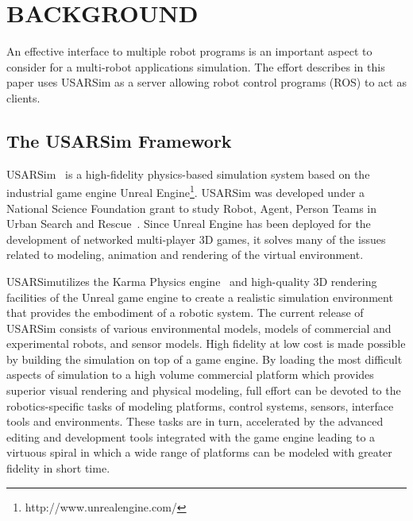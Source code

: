 \section*{BACKGROUND}
An effective interface to multiple robot programs is an important aspect to consider for a multi-robot applications simulation. The effort describes in this paper uses USARSim as a server allowing robot control programs (ROS)
to act as clients.

\subsection*{The USARSim Framework}


USARSim~\cite{CARPIN.LNAI.2006,WANG.WSC.2003} is a high-fidelity physics-based simulation system based on the industrial game engine Unreal Engine\footnote{http://www.unrealengine.com/}. USARSim was developed under a National Science Foundation grant to study Robot, Agent, Person Teams in Urban Search and Rescue~\cite{LEWIS.ICHC.2003}. Since Unreal Engine has been deployed for the development of networked multi-player 3D games, it solves many of the issues related to modeling, animation and rendering
of the virtual environment.


USARSimutilizes the Karma Physics engine~\cite{KarmEngine} and high-quality 3D rendering facilities of the Unreal game engine to create a realistic simulation environment that provides the embodiment of a robotic
system. The current release of USARSim consists of various environmental models, models of commercial and experimental robots, and sensor models. High fidelity at low cost is made possible by building the simulation on top of a game engine. By loading the most
difficult aspects of simulation to a high volume commercial platform which provides superior visual rendering and physical modeling, full effort can be devoted to the robotics-specific tasks of modeling platforms, control systems, sensors, interface tools and environments. These tasks are in turn, accelerated by the advanced editing and development tools integrated with the game engine leading to a virtuous spiral in which a wide range of platforms can be modeled with greater fidelity in short time.

